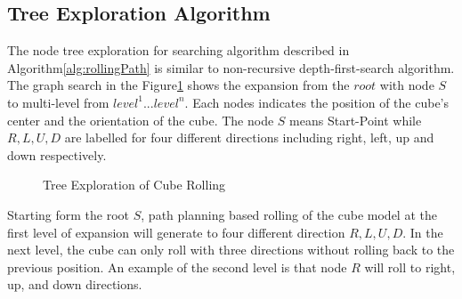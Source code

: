 \subsection{Tree Exploration Algorithm}
The node tree exploration for searching algorithm described in Algorithm\ref{alg:rollingPath} is similar to non-recursive depth-first-search algorithm.
The graph search in the Figure\ref{fig:nodeTree} shows the expansion from the $root$ with node $S$ to multi-level from $level^1 ... level^n$.
Each nodes indicates the position of the cube's center and the orientation of the cube. The node $S$ means Start-Point while $R,L,U,D$ are labelled for four different directions including right, left, up and down respectively. 

\vskip 0.5cm
\begin{figure}[h]
	
	\caption{Tree Exploration of Cube Rolling}
\label{fig:nodeTree}
\end{figure}

Starting form the root $S$, path planning based rolling of the cube model at the first level of expansion will generate to four different direction $R,L,U,D$. In the next level, the cube can only roll with three directions without rolling back to the previous position.  An example of the second level is that node $R$ will roll to right, up, and down directions. 
 
%
% 
%
%

\clearpage
\newpage